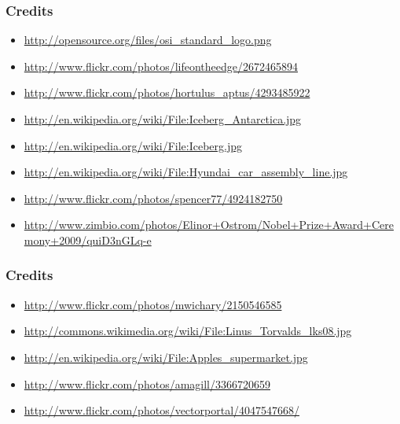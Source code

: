 \documentclass[18pt]{beamer}
\begin{document}
\begin{frame}
\frametitle{Credits}
\begin{itemize}
\item \url{http://opensource.org/files/osi_standard_logo.png}
\item \url{http://www.flickr.com/photos/lifeontheedge/2672465894}
\item \url{http://www.flickr.com/photos/hortulus_aptus/4293485922}
\item \url{http://en.wikipedia.org/wiki/File:Iceberg_Antarctica.jpg}
\item \url{http://en.wikipedia.org/wiki/File:Iceberg.jpg}
\item \url{http://en.wikipedia.org/wiki/File:Hyundai_car_assembly_line.jpg}
\item \url{http://www.flickr.com/photos/spencer77/4924182750}
\item \url{http://www.zimbio.com/photos/Elinor+Ostrom/Nobel+Prize+Award+Ceremony+2009/quiD3nGLq-e}
\end{itemize}
\end{frame}


\begin{frame}
\frametitle{Credits}
\begin{itemize}
\item \url{http://www.flickr.com/photos/mwichary/2150546585}
\item \url{http://commons.wikimedia.org/wiki/File:Linus_Torvalds_lks08.jpg}
\item \url{http://en.wikipedia.org/wiki/File:Apples_supermarket.jpg}
\item \url{http://www.flickr.com/photos/amagill/3366720659}
\item \url{http://www.flickr.com/photos/vectorportal/4047547668/}
\end{itemize}
\end{frame}
\end{document}
